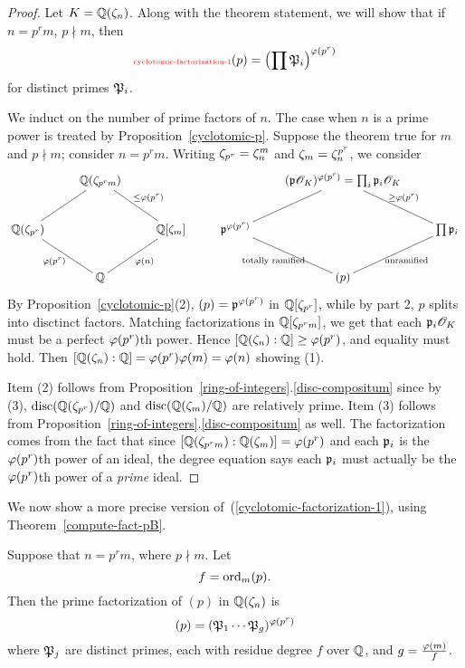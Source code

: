 \begin{proof}
Let $K=\mathbb{Q}(\zeta_n)$. Along with the theorem statement, we will show that if $n=p^rm$, $p\nmid m$, then 
\begin{equation}\llabel{cyclotomic-factorization-1}
(p)=\pa{\prod \mP_i}^{\ph(p^r)}
\end{equation}
for distinct primes $\mathfrak{P}_i$.

We induct on the number of prime factors of $n$. The case when $n$ is a prime power is treated by Proposition~\ref{cyclotomic-p}. Suppose the theorem true for $m$ and $p\nmid m$; consider $n=p^rm$. Writing
$\zeta_{p^r}=\zeta_{n}^m$ and $\zeta_{m}=\zeta_n^{p^r}$, we consider
\[%
\xymatrix{
& \Q(\ze_{p^rm})\ar@{-}[ld]\ar@{-}[rd]^{\le \ph(p^r)} & & &(\mfp \sO_K)^{\ph(p^r)}=\prod_i \mfp_i\sO_K\ar@{-}[ld]\ar@{-}[rd]^{\ge\ph(p^r)}&\\
\Q(\ze_{p^r})&&\Q[\ze_m]&\mfp^{\ph(p^r)}&&\prod \mfp_i\\
&\Q\ar@{-}[lu]^{\ph(p^r)}\ar@{-}[ru]_{\ph(n)}&&&(p)\ar@{-}[lu]^{\text{totally ramified}}\ar@{-}[ru]_{\text{unramified}}& 
}
\]%
By Proposition~\ref{cyclotomic-p}(2), $(p)=\mathfrak{p}^{\varphi(p^r)}$ in $\mathbb{Q}[\zeta_{p^r}]$, while by part 2, $p$ splits into disctinct factors. Matching factorizations in $\mathbb{Q}[\zeta_{p^rm}]$, we get that each $\mathfrak{p}_i\mathscr{O}_K$ must be a perfect $\varphi(p^r)$th power. %
Hence $[\mathbb{Q}(\zeta_n):\mathbb{Q}]\ge \varphi(p^r)$, and equality must hold. Then $[\mathbb{Q}(\zeta_n):\mathbb{Q}]=\varphi(p^r)\varphi(m)=\varphi(n)$ showing (1).

Item (2) follows from Proposition~\ref{ring-of-integers}.\ref{disc-compositum} since by (3), $\operatorname{disc}(\mathbb{Q}(\zeta_{p^r})/\mathbb{Q})$ and $\operatorname{disc}(\mathbb{Q}(\zeta_{m})/\mathbb{Q})$ are relatively prime.
Item (3) follows from Proposition~\ref{ring-of-integers}.\ref{disc-compositum} as well. The factorization comes from the fact that since $[\mathbb{Q}(\zeta_{p^rm}):\mathbb{Q}(\zeta_m)]=\varphi(p^r)$ and each $\mathfrak{p}_i$ is the $\varphi(p^r)$th power of an ideal, 
the degree equation says each $\mathfrak{p}_i$ must actually be the  $\varphi(p^r)$th power of a {\it prime} ideal.
\end{proof}
We now show a more precise version of~(\ref{cyclotomic-factorization-1}), using Theorem~\ref{compute-fact-pB}.
\begin{thm}
Suppose that $n=p^rm$, where $p\nmid m$. Let 
\[
f=\operatorname{ord}_{m} (p).
\]
Then the prime factorization of $(p)$ in $\mathbb{Q}(\zeta_n)$ is
\[
(p)=(\mathfrak{P}_1\cdots \mathfrak{P}_g)^{\varphi(p^r)}
\]
where $\mathfrak{P}_j$ are distinct primes, each with residue degree $f$ over $\mathbb{Q}$, and $g=\frac{\varphi(m)}{f}$.
\end{thm}
